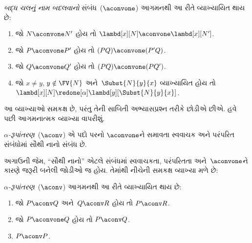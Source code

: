 \documentclass[../../../include/open-logic-section]{subfiles}
\begin{document}
\begin{defn} 
  \emph{બદ્ધ ચલનું નામ બદલવાનો} સંબંધ~($\aconvone$)
  આગમનથી આ રીતે વ્યાખ્યાયિત થાય છે:
  \begin{enumerate}
  \item જો $N \aconvone N'$ હોય તો $\lambd[x][N] \aconvone
    \lambd[x][N']$. 
  \item જો $P \aconvone P'$ હોય તો $(PQ) \aconvone (P'Q)$.
  \item જો $Q \aconvone Q'$ હોય તો $(PQ) \aconvone (PQ')$.
  \item જો $x \neq y$, $y \notin \FV{N}$ અને~$\Subst{N}{y}{x}$
    વ્યાખ્યાયિત હોય તો
    $\lambd[x][N] \redone[\alpha] \lambd[y][\Subst{N}{y}{x}]$.
  \end{enumerate}
\end{defn}

આ વ્યાખ્યાઓ સમકક્ષ છે, પરંતુ તેની સાબિતી અભ્યાસપ્રશ્ન તરીકે
છોડીએ છીએ. હવે પછી આગમનાત્મક વ્યાખ્યા વાપરીશું.

\begin{defn}
  \emph{$\alpha$-રૂપાંતરણ}~($\aconv$) એ પદો પરનો
  $\aconvone$ને સમાવતા સ્વવાચક અને પરંપરિત સંબંધોમાં
  સૌથી નાનો સંબંધ છે.
\end{defn}

અગાઉની જેમ, ``સૌથી નાનો'' એટલે સંબંધમાં સ્વવાચકતા,
પરંપરિતતા અને~$\aconvone$ને કારણે જરૂરી બનેલી જોડીઓ જ હોય.
તેમાંથી નીચેની સમકક્ષ વ્યાખ્યા મળે છે:

\begin{defn} 
  \emph{$\alpha$-રૂપાંતરણ}~($\aconv$) આગમનથી આ રીતે
  વ્યાખ્યાયિત થાય છે:
  \begin{enumerate}
  \item જો $P \aconv Q$ અને~$Q \aconv R$ હોય તો
    $P \aconv R$. 
  \item જો $P \aconvone Q$ હોય તો $P \aconv Q$.
  \item $P \aconv P$. 
  \end{enumerate}
\end{defn}
\end{document}
